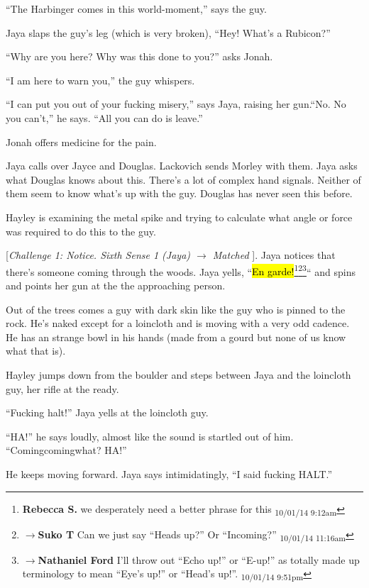 ``The Harbinger comes in this world-moment,'' says the guy.

Jaya slaps the guy's leg (which is very broken), ``Hey!  What's a Rubicon?''

``Why are you here? Why was this done to you?'' asks Jonah.

``I am here to warn you,'' the guy whispers.

``I can put you out of your fucking misery,'' says Jaya, raising her gun.``No.  No you can't,'' he says.  ``All you can do is leave.''

Jonah offers medicine for the pain.

Jaya calls over Jayce and Douglas.  Lackovich sends Morley with them.  Jaya asks what Douglas knows about this. There's a lot of complex hand signals.  Neither of them seem to know what's up with the guy.  Douglas has never seen this before.

Hayley is examining the metal spike and trying to calculate what angle or force was required to do this to the guy.  



{[}\textit{Challenge 1: Notice.  Sixth Sense 1 (Jaya) $\rightarrow$ Matched }{]}.  Jaya notices that there's someone coming through the woods.  Jaya yells, ``\hl{En garde!}\footnote{\textbf{Rebecca S. }we desperately need a better phrase for this \textsubscript{10/01/14 9:12am}}\footnote{$\rightarrow$\textbf{Suko T }Can we just say ``Heads up?''  Or ``Incoming?'' \textsubscript{10/01/14 11:16am}}\footnote{$\rightarrow$\textbf{Nathaniel Ford }I'll throw out ``Echo up!'' or ``E-up!'' as totally made up terminology to mean ``Eye's up!'' or ``Head's up!''. \textsubscript{10/01/14 9:51pm}}`` and spins and points her gun at the the approaching person.

Out of the trees comes a guy with dark skin like the guy who is pinned to the rock.  He's naked except for a loincloth and is moving with a very odd cadence.  He has an strange bowl in his hands (made from a gourd but none of us know what that is).

Hayley jumps down from the boulder and steps between Jaya and the loincloth guy, her rifle at the ready.

``Fucking halt!'' Jaya yells at the loincloth guy.

``HA!'' he says loudly, almost like the sound is startled out of him.  ``Comingcomingwhat?  HA!''

He keeps moving forward.  Jaya says intimidatingly, ``I said fucking HALT.''

